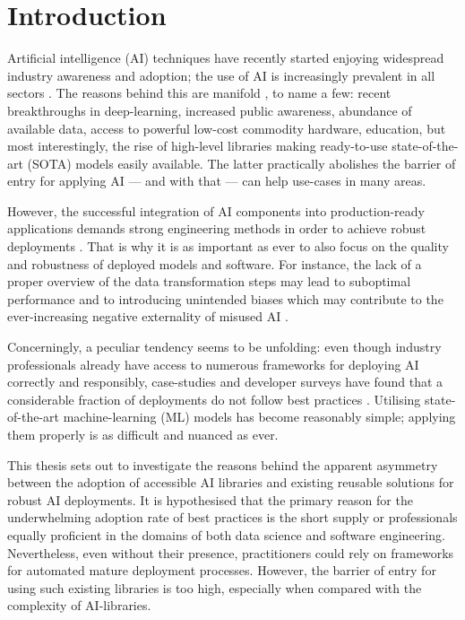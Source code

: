 \chapter{Introduction}

Artificial intelligence (AI) techniques have recently started enjoying widespread industry awareness and adoption; the use of AI is increasingly prevalent in all sectors \cite{wirtz2019artificial,bosch2021engineering}. The reasons behind this are manifold \cite{jordan2015machine}, to name a few: recent breakthroughs in deep-learning, increased public awareness, abundance of available data, access to powerful low-cost commodity hardware, education, but most interestingly, the rise of high-level libraries making ready-to-use state-of-the-art (SOTA) models easily available. The latter practically abolishes the barrier of entry for applying AI --- and with that --- can help use-cases in many areas. 

However, the successful integration of AI components into production-ready applications demands strong engineering methods in order to achieve robust deployments \cite{serban2020adoption}. That is why it is as important as ever to also focus on the quality and robustness of deployed models and software. For instance, the lack of a proper overview of the data transformation steps may lead to suboptimal performance and to introducing unintended biases which may contribute to the ever-increasing negative externality of misused AI \cite{o2016weapons}.

Concerningly, a peculiar tendency seems to be unfolding: even though industry professionals already have access to numerous frameworks for deploying AI correctly and responsibly, case-studies and developer surveys have found that a considerable fraction of deployments do not follow best practices \cite{serban2020adoption,haakman2021ai,amershi2019software,de2019understanding,sculley2015hidden}. Utilising state-of-the-art machine-learning (ML) models has become reasonably simple; applying them properly is as difficult and nuanced as ever. 

This thesis sets out to investigate the reasons behind the apparent asymmetry between the adoption of accessible AI libraries and existing reusable solutions for robust AI deployments. It is hypothesised that the primary reason for the underwhelming adoption rate of best practices is the short supply or professionals equally proficient in the domains of both data science and software engineering. Nevertheless, even without their presence, practitioners could rely on frameworks for automated mature deployment processes. However, the barrier of entry for using such existing libraries is too high, especially when compared with the complexity of AI-libraries.

